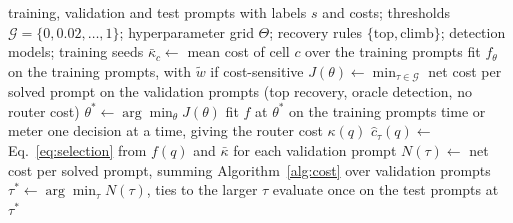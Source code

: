 \begin{algorithm}[t]
\caption{Fitting a router and choosing its threshold.}
\label{alg:router}
\small
\begin{algorithmic}[1]
\Require training, validation and test prompts with labels $s$ and costs;
  thresholds $\mathcal{G} = \{0, 0.02, \dots, 1\}$; hyperparameter grid
  $\Theta$; recovery rules $\{\mathrm{top}, \mathrm{climb}\}$; detection
  models; training seeds
\State $\bar{\kappa}_c \gets$ mean cost of cell $c$ over the training prompts
\For{$\theta \in \Theta$}
  \State fit $f_\theta$ on the training prompts, with $\tilde{w}$ if
    cost-sensitive
  \State $J(\theta) \gets \min_{\tau \in \mathcal{G}}$ net cost per solved
    prompt on the validation prompts (top recovery, oracle detection, no
    router cost)
\EndFor
\State $\theta^{*} \gets \arg\min_{\theta} J(\theta)$
  \State fit $f$ at $\theta^{*}$ on the training prompts
  \State time or meter one decision at a time, giving the router cost
    $\kappa(q)$
      \State $\hat{c}_\tau(q) \gets$ Eq.~\eqref{eq:selection} from
        $f(q)$ and $\bar{\kappa}$ for each validation prompt
      \State $N(\tau) \gets$ net cost per solved prompt, summing
        Algorithm~\ref{alg:cost} over validation prompts
    \EndFor
    \State $\tau^{*} \gets \arg\min_{\tau} N(\tau)$, ties to the larger
      $\tau$
    \State evaluate once on the test prompts at $\tau^{*}$
  \EndFor
\EndFor
\end{algorithmic}
\end{algorithm}

